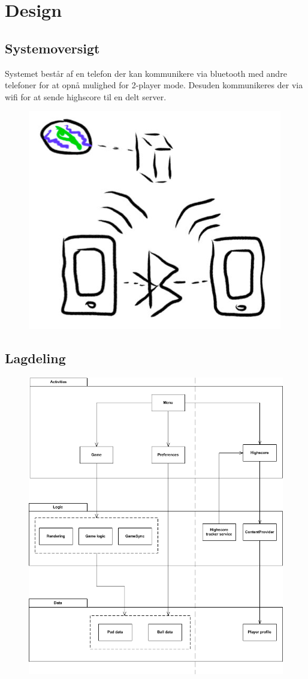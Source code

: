 \section{Design}
\subsection{Systemoversigt}
Systemet består af en telefon der kan kommunikere via bluetooth med andre telefoner for at opnå mulighed for 2-player mode. Desuden kommunikeres der via wifi for at sende highscore til en delt server.
\begin{figure}[H]
\centering
\includegraphics[scale=0.5]{Images/SystemOverview}
\end{figure}

\subsection{Lagdeling}
\begin{figure}[H]
\centering
\includegraphics[scale=0.5]{Images/PONGz0rarchitecture}
\end{figure}
